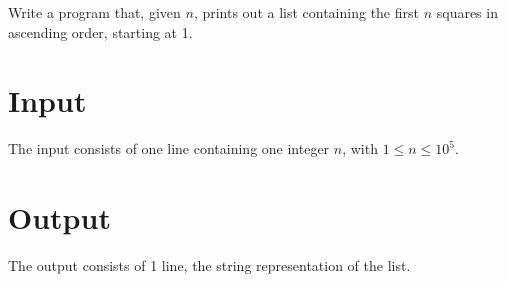
Write a program that, given $n$, prints out a list containing the first $n$ squares in ascending order, starting at 1.

\section*{Input}
The input consists of one line containing one integer $n$, with $1 \leq n \leq 10^5$.

\section*{Output}
The output consists of 1 line, the string representation of the list.
